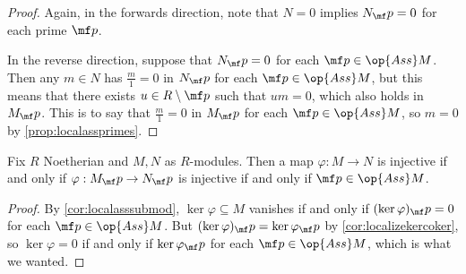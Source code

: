 \begin{proof}
	Again, in the forwards direction, note that $N=0$ implies $N_\mf p=0$ for each prime $\mf p$.

	In the reverse direction, suppose that $N_\mf p=0$ for each $\mf p\in\op{Ass}M$. Then any $m\in N$ has $\frac m1=0$ in $N_\mf p$ for each $\mf p\in\op{Ass}M$, but this means that there exists $u\in R\setminus\mf p$ such that $um=0$, which also holds in $M_\mf p$. This is to say that $\frac m1=0$ in $M_\mf p$ for each $\mf p\in\op{Ass}M$, so $m=0$ by \autoref{prop:localassprimes}.
\end{proof}
\begin{corollary}
	Fix $R$ Noetherian and $M,N$ as $R$-modules. Then a map $\varphi:M\to N$ is injective if and only if $\varphi:M_\mf p\to N_\mf p$ is injective if and only if $\mf p\in\op{Ass}M$.
\end{corollary}
\begin{proof}
	By \autoref{cor:localasssubmod}, $\ker\varphi\subseteq M$ vanishes if and only if $(\ker\varphi)_\mf p=0$ for each $\mf p\in\op{Ass}M$. But $(\ker\varphi)_\mf p=\ker\varphi_\mf p$ by \autoref{cor:localizekercoker}, so $\ker\varphi=0$ if and only if $\ker\varphi_\mf p$ for each $\mf p\in\op{Ass}M$, which is what we wanted.
\end{proof}

